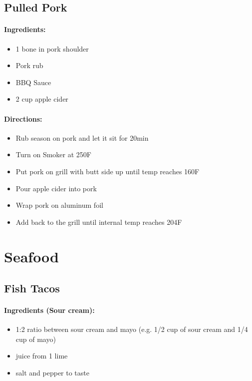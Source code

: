 \documentclass{article}
\begin{document}
\subsection{Pulled Pork}

\paragraph{Ingredients:}
\begin{itemize}
    \item 1 bone in pork shoulder
    \item Pork rub
    \item BBQ Sauce
    \item 2 cup apple cider
\end{itemize}

\paragraph{Directions:}
\begin{itemize}
    \item Rub season on pork and let it sit for 20min
    \item Turn on Smoker at 250F
    \item Put pork on grill with butt side up until temp reaches 160F
    \item Pour apple cider into pork
    \item Wrap pork on aluminum foil
    \item Add back to the grill until internal temp reaches 204F
\end{itemize}

\section{Seafood}


\subsection{Fish Tacos} 

\paragraph{Ingredients (Sour cream):}
\begin{itemize}
    \item 1:2 ratio between sour cream and mayo (e.g. 1/2 cup of sour cream and 1/4 cup of mayo)
    \item juice from 1 lime
    \item salt and pepper to taste
\end{itemize}  
\end{document}

